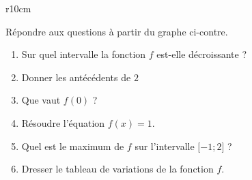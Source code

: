 
\begin{exercice}\label{exosmath-0516}

\begin{wrapfigure}{r}{10cm}
   \vspace{-0.5cm}        %
   \centering
   
\end{wrapfigure}

    Répondre aux questions à partir du graphe ci-contre.
    \begin{enumerate}
        \item
            Sur quel intervalle la fonction \( f\) est-elle décroissante ?
        \item
            Donner les antécédents de \( 2\)
        \item
            Que vaut \( f(0)\) ?
        \item
            Résoudre l'équation \( f(x)=1\).
        \item
            Quel est le maximum de \( f\) sur l'intervalle \( \mathopen[ -1 ; 2 \mathclose]\) ?
        \item
            Dresser le tableau de variations de la fonction \( f\).
    \end{enumerate}

\end{exercice}

